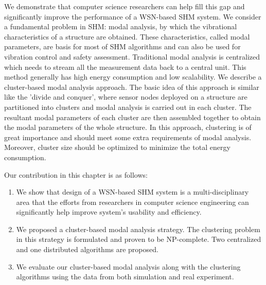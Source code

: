 We demonstrate that computer science researchers can help fill this gap and significantly improve the performance of a WSN-based SHM system. We consider a fundamental problem in SHM: modal analysis, by which the vibrational characteristics of a structure are obtained.  These characteristics, called modal parameters, are basis for most of SHM algorithms and can also be used for vibration control and safety assessment. Traditional modal analysis is centralized which needs to stream all the measurement data back to a central unit. This method generally has high energy consumption and low scalability. We describe a cluster-based modal analysis approach. The basic idea of this approach is similar like the 'divide and conquer', where sensor nodes deployed on a structure are partitioned into clusters and modal analysis is carried out in each cluster. The resultant modal parameters of each cluster are then assembled together to obtain the modal parameters of the whole structure. In this approach, clustering is of great importance and should meet some extra requirements of modal analysis. Moreover, cluster size should be optimized to minimize the total energy consumption.

Our contribution in this chapter is as follows:
\begin{enumerate}
\item	We show that design of a WSN-based SHM system is a multi-disciplinary area that the efforts from researchers in computer science engineering can significantly help improve system's usability and efficiency. 
\item We proposed a cluster-based modal analysis strategy. The clustering problem in this strategy is formulated and proven to be NP-complete.  Two centralized and one distributed algorithms are proposed.
\item	We evaluate our cluster-based modal analysis along with the clustering algorithms using the data from both simulation and real experiment.
\end{enumerate}
